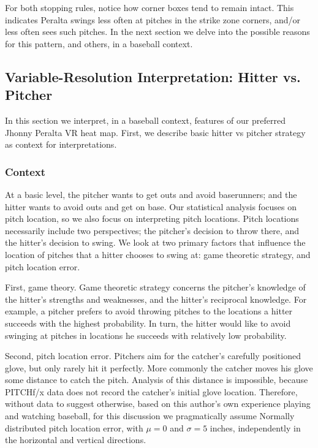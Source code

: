 For both stopping rules, notice how corner boxes tend to remain intact. This indicates Peralta swings less often at pitches in the strike zone corners, and/or less often sees such pitches. In the next section we delve into the possible reasons for this pattern, and others, in a baseball context.

\subsection{Variable-Resolution Interpretation: Hitter vs. Pitcher} %
In this section we interpret, in a baseball context, features of our preferred Jhonny Peralta VR heat map. First, we describe basic hitter vs pitcher strategy as context for interpretations. 

\subsubsection{Context}
At a basic level, the pitcher wants to get outs and avoid baserunners; and the hitter wants to avoid outs and get on base. Our statistical analysis focuses on pitch location, so we also focus on interpreting  pitch locations. Pitch locations necessarily include two perspectives; the pitcher's decision to throw there, and the hitter's decision to swing. We look at two primary factors that influence the location of pitches that a hitter chooses to swing at: game theoretic strategy, and pitch location error. 

First, game theory. Game theoretic strategy concerns the pitcher's knowledge of the hitter's strengths and weaknesses, and the hitter's reciprocal knowledge. For example, a pitcher prefers to avoid throwing pitches to the locations a hitter succeeds with the highest probability. In turn, the hitter would like to avoid swinging at pitches in locations he succeeds with relatively low probability.

Second, pitch location error. Pitchers aim for the catcher's carefully positioned glove, but only rarely hit it perfectly. More commonly the catcher moves his glove some distance to catch the pitch.  Analysis of this distance is impossible, because PITCHf/x\textsuperscript{\textregistered} data does not record the catcher's initial glove location. Therefore, without data to suggest otherwise, based on this author's own experience playing and watching baseball, for this discussion we pragmatically assume Normally distributed pitch location error, with $\mu = 0$ and $\sigma = 5$ inches, independently in the horizontal and vertical directions. 


